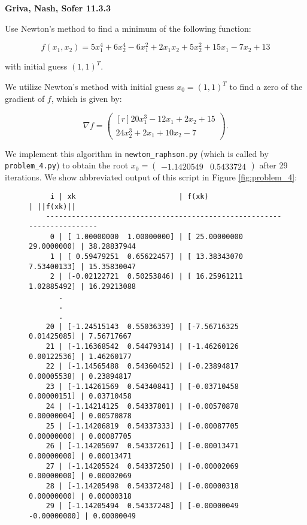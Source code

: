 \textbf{Griva, Nash, Sofer 11.3.3}

Use Newton's method to find a minimum of the following function:

$$
f(x_1, x_2) = 5 x_1^4 + 6 x_2^4 - 6 x_1^2 + 2 x_1 x_2 + 5 x_2^2 + 15 x_1 - 7 x_2 + 13
$$

with initial guess $(1, 1)^T$.

\begin{solution}
    We utilize Newton's method with initial guess $x_0 = (1, 1)^T$ to find a zero of the gradient of $f$, which is given by:

    $$
    \nabla f = \begin{pmatrix*}[r]
        20 x_1^3 - 12 x_1 + 2 x_2 + 15 \\
        24 x_2^3 + 2 x_1 + 10 x_2 - 7
    \end{pmatrix*}.
    $$

    We implement this algorithm in \texttt{newton\_raphson.py} (which is called by 
    \texttt{problem\_4.py}) to obtain the root $x_0 = \begin{pmatrix} -1.1420549 & 0.5433724 \end{pmatrix}$ after 29 
    iterations. We show abbreviated output of this script in Figure \ref{fig:problem_4}:
    \ \\

    \begin{figure}[h]
        \centering
        \begin{verbatim}
     i | xk                        | f(xk)                     | ||f(xk)||            
    -----------------------------------------------------------------------
     0 | [ 1.00000000  1.00000000] | [ 25.00000000  29.0000000] | 38.28837944
     1 | [ 0.59479251  0.65622457] | [ 13.38343070  7.53400133] | 15.35830047
     2 | [-0.02122721  0.50253846] | [ 16.25961211  1.02885492] | 16.29213088
       .
       .
       .
    20 | [-1.24515143  0.55036339] | [-7.56716325   0.01425085] | 7.56717667
    21 | [-1.16368542  0.54479314] | [-1.46260126   0.00122536] | 1.46260177
    22 | [-1.14565488  0.54360452] | [-0.23894817   0.00005538] | 0.23894817
    23 | [-1.14261569  0.54340841] | [-0.03710458   0.00000151] | 0.03710458
    24 | [-1.14214125  0.54337801] | [-0.00570878   0.00000004] | 0.00570878
    25 | [-1.14206819  0.54337333] | [-0.00087705   0.00000000] | 0.00087705
    26 | [-1.14205697  0.54337261] | [-0.00013471   0.00000000] | 0.00013471
    27 | [-1.14205524  0.54337250] | [-0.00002069   0.00000000] | 0.00002069
    28 | [-1.14205498  0.54337248] | [-0.00000318   0.00000000] | 0.00000318
    29 | [-1.14205494  0.54337248] | [-0.00000049  -0.00000000] | 0.00000049
    

\end{verbatim}
\end{figure}
\end{solution}
